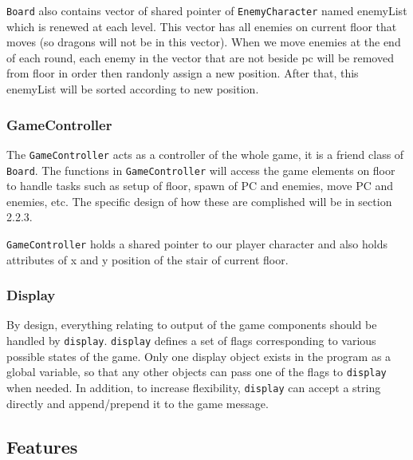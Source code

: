 \documentclass[11pt]{article}
\theoremstyle{plain} \newtheorem{theorem*}{Theorem}[subsection]
\begin{document}
\texttt{Board} also contains vector of shared pointer of 
\texttt{EnemyCharacter} named \textsf{enemyList} which is renewed at each level.
This vector has all enemies on current \textsf{floor} that moves 
(so dragons will not be in this vector).
When we move enemies at the end of each round, each enemy in the vector 
that are not beside pc will
be removed from \textsf{floor} in order then randonly assign a new position.
After that, this \textsf{enemyList} will be sorted according to new position.



\subsubsection{GameController}

The \texttt{GameController} acts as a controller of the whole game,
it is a friend class of \texttt{Board}. 
The functions in \texttt{GameController} will access
the game elements on \textsf{floor} to handle tasks such as setup of
\textsf{floor}, spawn of PC and enemies, move PC and enemies, etc.  The
specific design of how these are complished will be in section 2.2.3.

\texttt{GameController} holds a shared pointer to our player character and also
holds attributes of x and y position of the stair of current floor.

\subsubsection{Display} 

By design, everything relating to output of the game
components should be handled by \texttt{display}. \texttt{display} defines a
set of flags corresponding to various possible states of the game. Only one
display object exists in the program as a global variable, so that any other
objects can pass one of the flags to \texttt{display} when needed.  In
addition, to increase flexibility, \texttt{display} can accept a string
directly and append/prepend it to the game message.\\





\subsection{Features}
\end{document}
